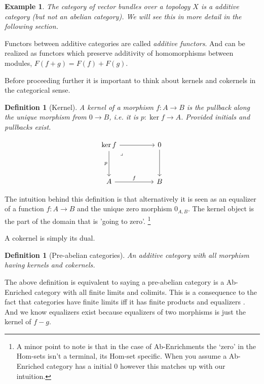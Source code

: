 \documentclass[12pt]{report}
\numberwithin{equation}{section}
\newtheorem{definition}[dummy]{Definition}
\newtheorem{example}[dummy]{Example}
\begin{document}
	\begin{example}
		The category of vector bundles over a topology $X$ is a additive category (but not an abelian category). We will see this in more detail in the following section.
	\end{example}
	Functors between additive categories are called \textit{additive functors}. And can be realized as functors which preserve additivity of homomorphisms between modules, $F(f+g)=F(f)+F(g).$
	
	Before proceeding further it is important to think about kernels and cokernels in the categorical sense.
	\begin{definition}[Kernel]
		A kernel of a morphism $f:A \to B$ is the pullback along the unique morphism from $0 \to B$, i.e. it is $p: \ker f \to A$. Provided initials and pullbacks exist.
		
		\[\begin{tikzcd}
			{\ker f} && 0 \\
			\\
			A && B
			\arrow["f", from=3-1, to=3-3]
			\arrow[from=1-3, to=3-3]
			\arrow[from=1-1, to=1-3]
			\arrow["p"',from=1-1, to=3-1]
			\arrow["\lrcorner"{anchor=center, pos=0.125}, draw=none, from=1-1, to=3-3]
		\end{tikzcd}\]
	\end{definition}
	The intuition behind this definition is that alternatively it is seen as an equalizer of a function $f:A \to B$ and the unique zero morphism $0_{A,B}$. The kernel object is the part of the domain that is 'going to zero'. \footnote{A minor point to note is that in the case of Ab-Enrichments the `zero' in the Hom-sets isn't a terminal, its Hom-set specific. When you assume a Ab-Enriched category has a initial 0 however this matches up with our intuition.}
	
	A cokernel is simply its dual.
	
	\begin{definition}[Pre-abelian categories]
		An additive category with all morphism having kernels and cokernels.
	\end{definition}
	The above definition is equivalent to saying a pre-abelian category is a Ab-Enriched category with all finite limits and colimits. This is a consequence to the fact that categories have finite limits iff it has finite products and equalizers \cite[Proposition~5.21]{Awodey}. And we know equalizers exist because equalizers of two morphisms is just the kernel of $f-g$.
	
	
	
\end{document}
